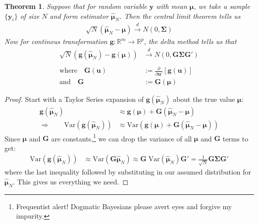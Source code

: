 \documentclass[12pt]{article}
\theoremstyle{plain}
\newtheorem{thm}{Theorem}[section]
\theoremstyle{definition}
\theoremstyle{remark}
\begin{document}
\begin{thm}
Suppose that for random variable $\boldsymbol{y}$ with mean
$\boldsymbol{\mu}$, we take a sample $\{\boldsymbol{y}_i\}$ of size $N$
and form estimator $\boldsymbol{\hat{\mu}}_N$. Then the central limit
theorem tells us
\begin{align*}
  \sqrt{N}\left(
  \boldsymbol{\hat{\mu}}_N
  -\boldsymbol{{\mu}}
  \right)
  \xrightarrow{d} N(0, \boldsymbol{\Sigma})
\end{align*}
Now for continous transformation
$\boldsymbol{g}:\mathbb{R}^m\rightarrow \mathbb{R}^p$, the delta method
tells us that
\begin{align*}
  \sqrt{N}\left(
  \boldsymbol{g}(\boldsymbol{\hat{\mu}}_N)
  -
  \boldsymbol{g}(\boldsymbol{\mu})
  \right)
  &\xrightarrow{d} N\left(
    0, \boldsymbol{G} \boldsymbol{\Sigma} \boldsymbol{G'}
  \right)\\\\
  \text{where}\quad
  \boldsymbol{G}(\boldsymbol{u})
  &:=\frac{\partial}{\partial \boldsymbol{u'}}
  \left[\boldsymbol{g}(\boldsymbol{u})\right]\\
  \text{and} \quad
  \boldsymbol{G} &:= \boldsymbol{G}(\boldsymbol{\mu})
\end{align*}
\end{thm}
\begin{proof}
Start with a Taylor Series expansion of
$\boldsymbol{g}(\boldsymbol{\hat{\mu}}_N)$ about the true value
$\boldsymbol{\mu}$:
\begin{align*}
  \boldsymbol{g}(\boldsymbol{\hat{\mu}}_N)
  &\approx
  \boldsymbol{g}(\boldsymbol{\mu})
  + \boldsymbol{G}
  \left(
  \boldsymbol{\hat{\mu}}_N - \boldsymbol{\mu}
  \right)\\
  \Rightarrow\qquad
  \text{Var}\left(\boldsymbol{g}(\boldsymbol{\hat{\mu}}_N)\right)
  &\approx
  \text{Var}\left(\boldsymbol{g}(\boldsymbol{\mu})
  + \boldsymbol{G}
  \left(
  \boldsymbol{\hat{\mu}}_N - \boldsymbol{\mu}
  \right)
  \right)
\end{align*}
Since $\boldsymbol{\mu}$ and $\boldsymbol{G}$ are
constants,\footnote{Frequentist alert! Dogmatic Bayesians please avert
eyes and forgive my impurity.} we can drop the variance of all
$\boldsymbol{\mu}$ and $\boldsymbol{G}$ terms to get:
\begin{align*}
  \text{Var}\left(\boldsymbol{g}(\boldsymbol{\hat{\mu}}_N)\right)
  &\approx
  \text{Var}\left(
  \boldsymbol{G}
  \boldsymbol{\hat{\mu}}_N
  \right)
  \approx
  \boldsymbol{G}\;
  \text{Var}\left(
  \boldsymbol{\hat{\mu}}_N
  \right)
  \boldsymbol{G'}
  = \frac{1}{\sqrt{N}}
  \boldsymbol{G}
  \boldsymbol{\Sigma}
  \boldsymbol{G'}
\end{align*}
where the last inequality followed by substituting in our assumed
distribution for $\boldsymbol{\hat{\mu}}_N$. This gives us everything we
need.
\end{proof}
\end{document}
